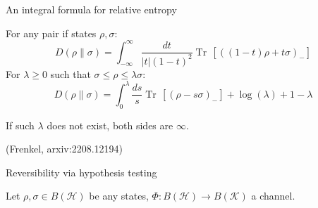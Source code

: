 \documentclass[mathserif]{beamer}
\newcommand{\<}{\langle}
\renewcommand{\>}{\rangle}
\newcommand{\Tr}{\operatorname{Tr}\,}
\newcommand{\Ha}{\mathcal H}
\newcommand{\Ka}{\mathcal K}
\begin{document}
\begin{frame}{An integral formula for relative entropy}


For any pair if states $\rho,\sigma$:
\medskip
\[
D(\rho\|\sigma)=\int_{-\infty}^\infty \frac{dt}{|t|(1-t)^2}\Tr[((1-t)\rho+t\sigma)_-]
\]
For $\lambda\ge 0$ such that  $\sigma\le \rho\le \lambda\sigma$:
\medskip
\[
D(\rho\|\sigma)=\int_0^\lambda \frac{ds}{s}\Tr[(\rho-s\sigma)_-]+ \log(\lambda)+1-\lambda
\]

 If such $\lambda$ does not exist, both sides are $\infty$.


 (Frenkel, arxiv:2208.12194)


\end{frame}

\begin{frame}{Reversibility via hypothesis testing}

Let $\rho, \sigma\in B(\Ha)$ be any states, $\Phi: B(\Ha)\to B(\Ka)$ a channel.
\medskip




\end{frame}
\end{document}
